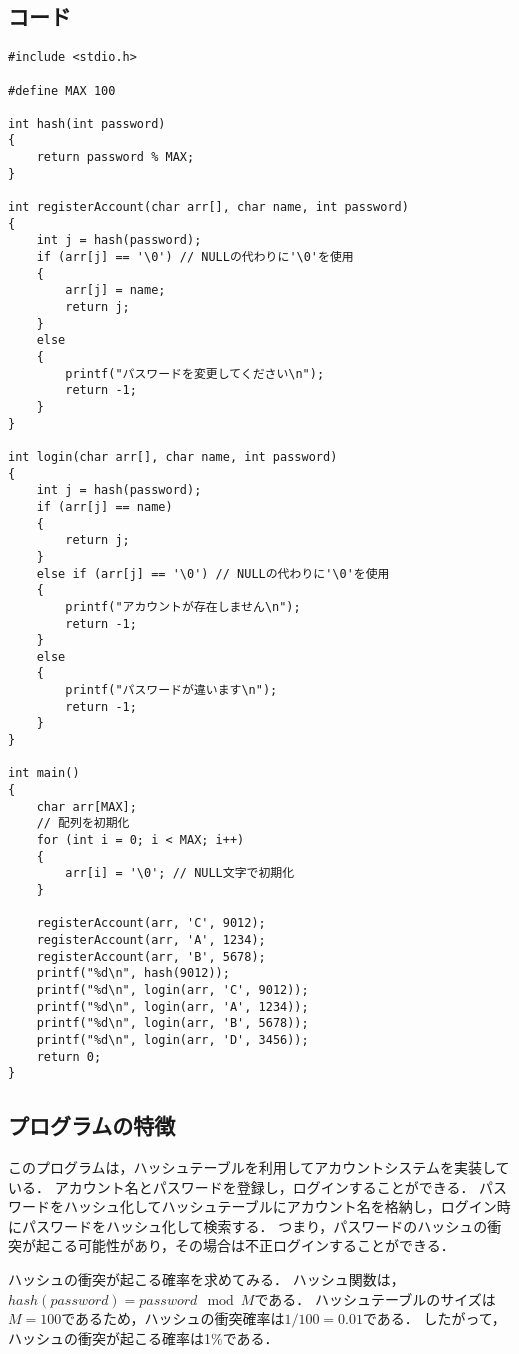 \documentclass{ltjsarticle}
\begin{document}
\subsection{コード}
\begin{lstlisting}[frame=single, lineskip=-5pt]
#include <stdio.h>

#define MAX 100

int hash(int password)
{
    return password % MAX;
}

int registerAccount(char arr[], char name, int password)
{
    int j = hash(password);
    if (arr[j] == '\0') // NULLの代わりに'\0'を使用
    {
        arr[j] = name;
        return j;
    }
    else
    {
        printf("パスワードを変更してください\n");
        return -1;
    }
}

int login(char arr[], char name, int password)
{
    int j = hash(password);
    if (arr[j] == name)
    {
        return j;
    }
    else if (arr[j] == '\0') // NULLの代わりに'\0'を使用
    {
        printf("アカウントが存在しません\n");
        return -1;
    }
    else
    {
        printf("パスワードが違います\n");
        return -1;
    }
}

int main()
{
    char arr[MAX];
    // 配列を初期化
    for (int i = 0; i < MAX; i++)
    {
        arr[i] = '\0'; // NULL文字で初期化
    }

    registerAccount(arr, 'C', 9012);
    registerAccount(arr, 'A', 1234);
    registerAccount(arr, 'B', 5678);
    printf("%d\n", hash(9012));
    printf("%d\n", login(arr, 'C', 9012));
    printf("%d\n", login(arr, 'A', 1234));
    printf("%d\n", login(arr, 'B', 5678));
    printf("%d\n", login(arr, 'D', 3456));
    return 0;
}
\end{lstlisting}

\subsection{プログラムの特徴}
このプログラムは，ハッシュテーブルを利用してアカウントシステムを実装している．
アカウント名とパスワードを登録し，ログインすることができる．
パスワードをハッシュ化してハッシュテーブルにアカウント名を格納し，ログイン時にパスワードをハッシュ化して検索する．
つまり，パスワードのハッシュの衝突が起こる可能性があり，その場合は不正ログインすることができる．

ハッシュの衝突が起こる確率を求めてみる．
ハッシュ関数は，$hash(password) = password \mod M$である．
ハッシュテーブルのサイズは$M = 100$であるため，ハッシュの衝突確率は$1/100 = 0.01$である．
したがって，ハッシュの衝突が起こる確率は1\%である．
\end{document}
